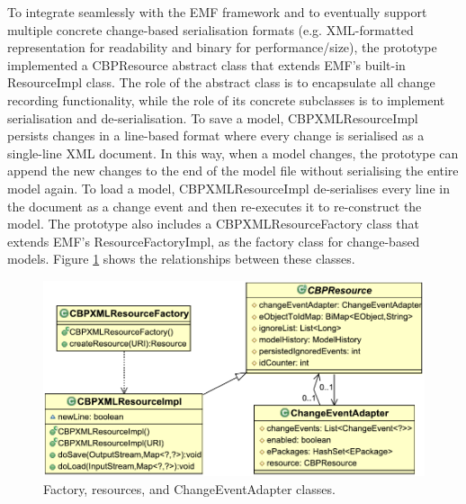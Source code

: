 To integrate seamlessly with the EMF framework and to eventually support multiple concrete change-based serialisation formats (e.g. XML-formatted representation for readability and binary for performance/size), the prototype implemented a \textsf{CBPResource} abstract class that extends EMF's built-in \textsf{ResourceImpl} class. The role of the abstract class is to encapsulate all change recording functionality, while the role of its concrete subclasses is to implement serialisation and de-serialisation. 
To save a model, \textsf{CBPXMLResourceImpl} persists changes in a line-based format where every change is serialised as a single-line XML document. In this way, when a model changes, the prototype can append the new changes to the end of the model file without serialising the entire model again. 
To load a model, \textsf{CBPXMLResourceImpl} de-serialises every line in the document as a change event and then re-executes it to re-construct the model.
The prototype also includes a \textsf{CBPXMLResourceFactory} class that extends EMF's \textsf{ResourceFactoryImpl}, as the factory class for change-based models. Figure \ref{fig:resources} shows the relationships between these classes.

\begin{figure}[th]
\centering
\includegraphics[width=\linewidth]{resources}
\caption{Factory, resources, and ChangeEventAdapter classes.}
\label{fig:resources}
\end{figure}

